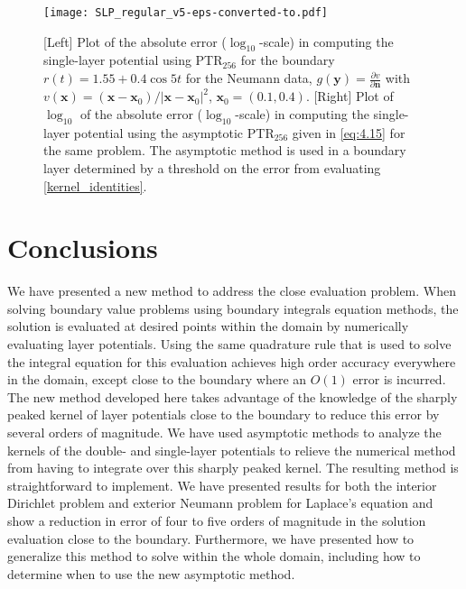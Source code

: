 \documentclass{article}[12pt]
\numberwithin{equation}{section}
\begin{document}
\begin{figure}[ht!]
  \centering
  \texttt{[image: SLP\_regular\_v5-eps-converted-to.pdf]}
  \caption{[Left] Plot of the absolute error
  ($\log_{10}$-scale) in computing the single-layer
    potential using PTR$_{256}$ for the boundary
    $r(t) = {1.55 + 0.4 \cos 5 t }$ for the Neumann data,
    $g(\mathbf{y}) = \frac{\partial v}{\partial \mathbf{n}}$ with
    $v(\mathbf{x}) = ( \mathbf{x} - \mathbf{x}_{0} ) / | \mathbf{x} -
    \mathbf{x}_{0} |^{2}$,
    $\mathbf{x}_{0} = {(0.1, 0.4)}$.  [Right] Plot of $\log_{10}$ of
    the absolute error ($\log_{10}$-scale) in
    computing the single-layer potential using the asymptotic
    PTR$_{256}$ given in \eqref{eq:4.15} for the same
    problem. The asymptotic method is used in a boundary layer
    determined by a threshold on the error from evaluating
    \eqref{kernel_identities}.}
      \label{fig:12}
\end{figure}

\section{Conclusions}
\label{sec:conclusions}

We have presented a new method to address the close evaluation
problem.  When solving boundary value problems using boundary
integrals equation methods, the solution is evaluated at desired
points within the domain by numerically evaluating layer potentials.
Using the same quadrature rule that is used to solve the integral
equation for this evaluation achieves high order accuracy everywhere
in the domain, except close to the boundary where an $O(1)$ error is
incurred.  The new method developed here takes advantage of the
knowledge of the sharply peaked kernel of layer potentials close to
the boundary to reduce this error by several orders of magnitude. We
have used asymptotic methods to analyze the kernels of the double- and
single-layer potentials to relieve the numerical method from having to
integrate over this sharply peaked kernel. The resulting method is
straightforward to implement. We have presented results for both the
interior Dirichlet problem and exterior Neumann problem for Laplace's
equation and show a reduction in error of four to five orders of
magnitude in the solution evaluation close to the
boundary. Furthermore, we have presented how to generalize this method
to solve within the whole domain, including how to determine when to
use the new asymptotic method.
\end{document}
